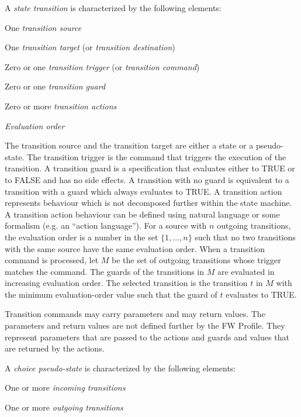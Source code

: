 \documentclass[definition]{../fwprofile}
\begin{document}
A \emph{state transition} is characterized by the following elements:

\begin{fw_itemize} 
\item One \emph{transition source}
\item One \emph{transition target} (or \emph{transition destination})
\item Zero or one \emph{transition trigger} (or \emph{transition command})
\item Zero or one \emph{transition guard}
\item Zero or more \emph{transition actions}
\item \emph{Evaluation order}
 
\end{fw_itemize}

The transition source and the transition target are either a state or a pseudo-state. The transition
trigger is the command that triggers the execution of the transition. A transition guard is a specification that evaluates either to TRUE or to FALSE and has no side effects. A transition with no guard is equivalent to a transition with a guard which always evaluates to TRUE. A transition action represents behaviour which is not decomposed further within the state machine. A transition action behaviour can be defined using natural language or some formalism (e.g. an “action language”).
For a source with $n$ outgoing transitions, the evaluation order is a number in the set $\{1,\ldots,n\}$ such that no two transitions with the same source have the same evaluation order.
When a transition command is processed, let $M$ be the set of outgoing transitions whose trigger matches the command. The guards of the transitions in $M$
are evaluated in increasing evaluation order. The selected transition is the transition $t$ in $M$ with the minimum evaluation-order value such that the guard of $t$
evaluates to TRUE.

Transition commands may carry parameters and may return values. The parameters and return
values are not defined further by the FW Profile. They represent parameters that are passed to
the actions and guards and values that are returned by the actions.

A \emph{choice pseudo-state} is characterized by the following elements:

\begin{fw_itemize} 
\item One or more \emph{incoming transitions}
\item One or more \emph{outgoing transitions}
\end{fw_itemize}
\end{document}

